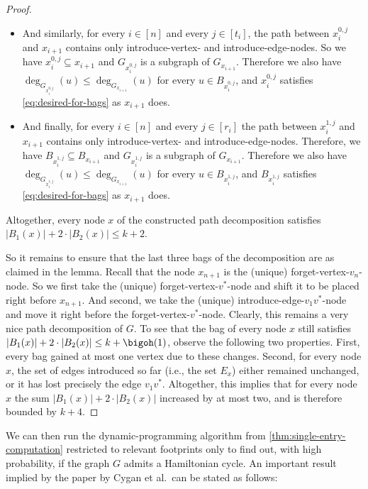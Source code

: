 \documentclass[a4paper,UKenglish,cleveref, autoref, thm-restate]{lipics-v2021}
\begin{document}
\begin{proof}
\begin{itemize}
		\item And similarly, for every $i \in [n]$ and every $j \in [t_i]$, the path between $x_i^{0,j}$ and $x_{i+1}$ contains only introduce-vertex- and introduce-edge-nodes.
		So we have $x_i^{0,j} \subseteq x_{i+1}$ and $G_{x_i^{0,j}}$ is a subgraph of $G_{x_{i+1}}$.
		Therefore we also have $\deg_{G_{x_i^{0,j}}}(u) \leq \deg_{G_{x_{i+1}}}(u)$ for every $u \in B_{x_i^{0,j}}$, and $x_i^{0,j}$ satisfies \eqref{eq:desired-for-bags} as $x_{i+1}$ does.
		\item And finally, for every $i \in [n]$ and every $j \in [r_i]$ the path between $x_i^{1,j}$ and $x_{i+1}$ contains only introduce-vertex- and introduce-edge-nodes.
		Therefore, we have $B_{x_i^{1,j}} \subseteq B_{x_{i+1}}$ and $G_{x_i^{1,j}}$ is a subgraph of $G_{x_{i+1}}$.
		Therefore we also have $\deg_{G_{x_i^{1,j}}}(u) \leq \deg_{G_{x_{i+1}}}(u)$ for every $u \in B_{x_i^{1,j}}$, and $B_{x_i^{1,j}}$ satisfies \eqref{eq:desired-for-bags} as $x_{i+1}$ does. 
		\end{itemize}
		Altogether, every node $x$ of the constructed path decomposition satisfies $|B_1(x)|+2 \cdot |B_2(x)| \leq k + 2$.
		
		So it remains to ensure that the last three bags of the decomposition are as claimed in the lemma.
		Recall that the node $x_{n+1}$ is the (unique) forget-vertex-$v_n$-node.
		So we first take the (unique) forget-vertex-$v^*$-node and shift it to be placed right before $x_{n+1}$. 
		And second, we take the (unique) introduce-edge-$v_1 v^*$-node and move it right before the forget-vertex-$v^*$-node.
		Clearly, this remains a very nice path decomposition of $G$.
		To see that the bag of every node $x$ still satisfies $|B_1(x)|+2 \cdot |B_2(x)| \leq k + \bigoh(1)$, observe the following two properties.
		First, every bag gained at most one vertex due to these changes.
		Second, for every node $x$, the set of edges introduced so far (i.e., the set $E_x$) either remained unchanged, or it has lost precisely the edge $v_1 v^*$.
		Altogether, this implies that for every node $x$ the sum $|B_1(x)| + 2 \cdot |B_2(x)|$ increased by at most two, and is therefore bounded by $k + 4$.
\end{proof}
We can then run the dynamic-programming algorithm from \cref{thm:single-entry-computation} restricted to relevant footprints only to find out, with high probability, if the graph $G$ admits a Hamiltonian cycle. 
An important result implied by the paper by Cygan et al.\ can be stated as follows:
\end{document}
